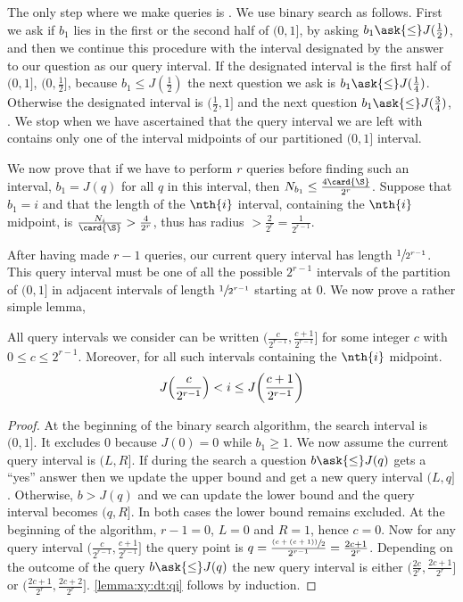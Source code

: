 The only step where we make queries is . We use binary
search as follows. First we ask if $b_1$ lies in the first or the second
half of $(0,1]$, by asking $b_1 \ask{\le} J(\frac{1}{2})$, and then we continue
this procedure with the interval designated by the answer to our question as
our query interval. If the designated interval is the first half of $(0,1]$,
\ie $(0, \frac{1}{2}]$, because $b_1 \le J(\frac{1}{2})$ the next question we
ask is $b_1 \ask{\le} J(\frac{1}{4})$. Otherwise the designated interval
is $(\frac{1}{2},1]$ and the next question $b_1 \ask{\le} J(\frac{3}{4})$,
\etc. We stop when we have ascertained that the query interval we are left with
contains only one of the interval midpoints of our partitioned
$(0,1]$ interval.

We now prove that if we have to perform $r$ queries before finding such an
interval, $b_1 = J(q)$ for all $q$ in this interval, then $N_{b_1} \le
\frac{4\card{\S}}{2^r}$. Suppose that $b_1 = i$ and that the length of the
$\nth{i}$ interval, containing the $\nth{i}$ midpoint, is
$\frac{N_i}{\card{\S}} > \frac{4}{2^r}$, thus has radius $> \frac{2}{2^r} =
\frac{1}{2^{r-1}}$.

After having made $r-1$ queries, our current query
interval has length $\sfrac{1}{2^{r-1}}$. This query interval must be one of
all the possible $2^{r-1}$ intervals of the partition of $(0,1]$ in adjacent
intervals of length $\sfrac{1}{2^{r-1}}$ starting at $0$. We now prove a rather
simple lemma,

\begin{lemma}
\label{lemma:xy:dt:qi}
All query intervals we consider can be written $(\frac{c}{2^{r-1}},
\frac{c+1}{2^{r-1}}]$ for some integer $c$ with $0 \le c \le 2^{r-1}$.
Moreover, for all such intervals containing the \(\nth{i}\) midpoint.
\begin{displaymath}
J\mleft(\frac{c}{2^{r-1}}\mright) < i \le J\mleft(\frac{c+1}{2^{r-1}}\mright)
\end{displaymath}
\end{lemma}

\begin{proof}
At the beginning of the binary search algorithm, the search interval is
$(0,1]$. It excludes \(0\) because \(J(0) = 0\) while \(b_1 \ge 1\). We now
assume the current query interval is \((L,R]\). If during the search a
question \(b \ask{\le} J(q)\) gets a ``yes'' answer then we update the upper
bound and get a new query interval \((L,q]\). Otherwise, \(b > J(q)\) and we
can update the lower bound and the query interval becomes \((q,R]\). In both
cases the lower bound remains excluded. At the beginning of the algorithm,
\(r - 1 = 0\), \(L=0\) and \(R=1\), hence \(c = 0\). Now for any query
interval $(\frac{c}{2^{r-1}}, \frac{c+1}{2^{r-1}}]$ the query point is \(q =
\frac{\sfrac{(c + (c + 1))}{2}}{2^{r-1}} = \frac{2c + 1}{2^r}\). Depending on the
outcome of the query \(b \ask{\le} J(q)\) the new query interval is
either \((\frac{2c}{2^{r}}, \frac{2c+1}{2^{r}}]\) or \((\frac{2c+1}{2^{r}},
\frac{2c+2}{2^{r}}]\). \ref{lemma:xy:dt:qi} follows by induction.
\end{proof}

